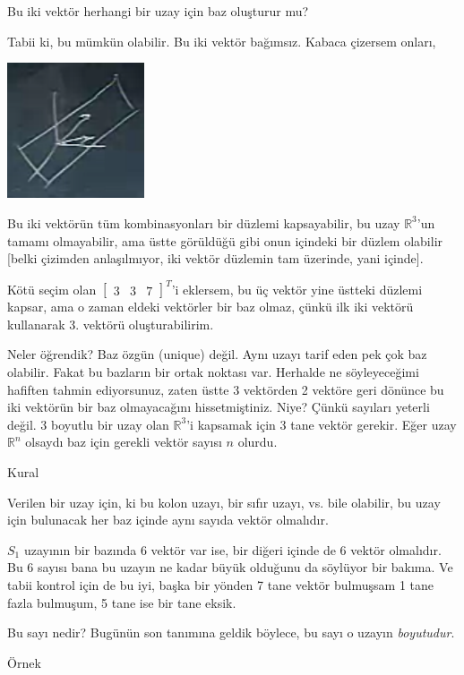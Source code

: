 \documentclass[12pt,fleqn]{article}\usepackage{../../common}
\begin{document}
Bu iki vektör herhangi bir uzay için baz oluşturur mu? 

Tabii ki, bu mümkün olabilir. Bu iki vektör bağımsız. Kabaca çizersem onları,

\includegraphics[height=4cm]{9_04.png}

Bu iki vektörün tüm kombinasyonları bir düzlemi kapsayabilir, bu uzay
$\mathbb{R}^3$'un tamamı olmayabilir, ama üstte görüldüğü gibi onun
içindeki bir düzlem olabilir [belki çizimden anlaşılmıyor, iki vektör
düzlemin tam üzerinde, yani içinde]. 

Kötü seçim olan $\left[\begin{array}{rrr}3&3&7\end{array}\right]^T$'i
eklersem, bu üç vektör yine üstteki düzlemi kapsar, ama o zaman eldeki
vektörler bir baz olmaz, çünkü ilk iki vektörü kullanarak 3. vektörü
oluşturabilirim. 

Neler öğrendik? Baz özgün (unique) değil. Aynı uzayı tarif eden pek çok baz
olabilir. Fakat bu bazların bir ortak noktası var. Herhalde ne
söyleyeceğimi hafiften tahmin ediyorsunuz, zaten üstte 3 vektörden 2
vektöre geri dönünce bu iki vektörün bir baz olmayacağını
hissetmiştiniz. Niye? Çünkü sayıları yeterli değil. 3 boyutlu bir uzay olan
$\mathbb{R}^3$'i kapsamak için 3 tane vektör gerekir. Eğer uzay
$\mathbb{R}^n$ olsaydı baz için gerekli vektör sayısı $n$ olurdu. 

Kural 

Verilen bir uzay için, ki bu kolon uzayı, bir sıfır uzayı, vs. bile
olabilir, bu uzay için bulunacak her baz içinde aynı sayıda vektör
olmalıdır. 

$S_1$ uzayının bir bazında 6 vektör var ise, bir diğeri içinde de 6 vektör
olmalıdır. Bu 6 sayısı bana bu uzayın ne kadar büyük olduğunu da söylüyor
bir bakıma. Ve tabii kontrol için de bu iyi, başka bir yönden 7 tane vektör
bulmuşsam 1 tane fazla bulmuşum, 5 tane ise bir tane eksik. 

Bu sayı nedir? Bugünün son tanımına geldik böylece, bu sayı o uzayın
{\em boyutudur}. 

Örnek
\end{document}
